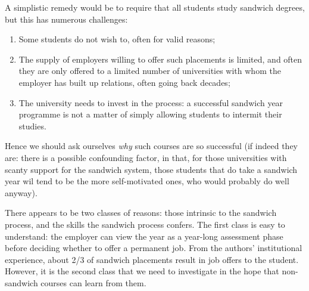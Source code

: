 \documentclass[conference]{IEEEtran}
\begin{document}
A simplistic remedy would be to require that all students study
sandwich degrees, but this has numerous challenges:

\begin{enumerate}
\item Some students do not wish to, often for valid reasons;
\item The supply of employers willing to offer such placements is
limited, and often they are only offered to a limited number of
universities with whom the employer has built up relations, often
going back decades;
\item The university needs to invest in the process: a successful
sandwich year programme is not a matter of simply allowing students to
intermit their studies.
\end{enumerate}

Hence we should ask ourselves \emph{why} such courses are so
successful (if indeed they are: there is a possible confounding
factor, in that, for those universities with scanty support for the
sandwich system, those students that do take a sandwich year wil tend
to be the more self-motivated ones, who would probably do well
anyway).

There appears to be two classes of reasons: those intrinsic to the
sandwich process, and the skills the sandwich process confers. The
first class is easy to understand: the employer can view the year as a
year-long assessment phase before deciding whether to offer a
permanent job. From the authors' institutional experience, about 2/3
of sandwich placements result in job offers to the student. However,
it is the second class that we need to investigate in the hope that
non-sandwich courses can learn from them. 


\end{document}
